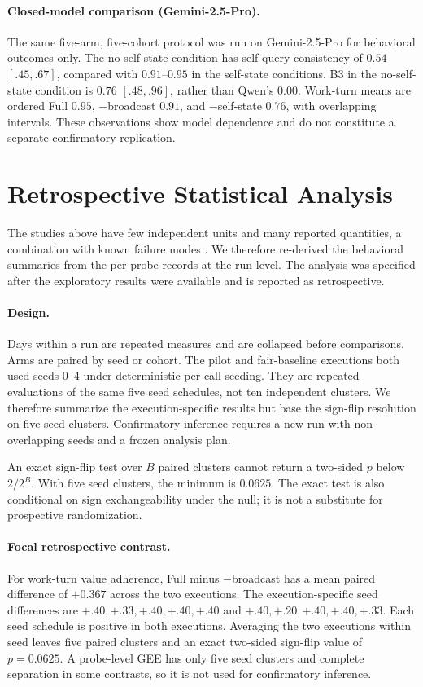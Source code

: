 \documentclass{article}
\begin{document}
\paragraph{Closed-model comparison (Gemini-2.5-Pro).} The same five-arm, five-cohort protocol was run on Gemini-2.5-Pro for behavioral outcomes only. The no-self-state condition has self-query consistency of $0.54$ $[.45,.67]$, compared with $0.91$--$0.95$ in the self-state conditions. B3 in the no-self-state condition is $0.76$ $[.48,.96]$, rather than Qwen's $0.00$. Work-turn means are ordered Full $0.95$, $-$broadcast $0.91$, and $-$self-state $0.76$, with overlapping intervals. These observations show model dependence and do not constitute a separate confirmatory replication.

\section{Retrospective Statistical Analysis}
\label{sec:stats}
The studies above have few independent units and many reported quantities, a combination with known failure modes \citep{card2020power,henderson2018deeprl}. We therefore re-derived the behavioral summaries from the per-probe records at the run level. The analysis was specified after the exploratory results were available and is reported as retrospective.

\paragraph{Design.} Days within a run are repeated measures and are collapsed before comparisons. Arms are paired by seed or cohort. The pilot and fair-baseline executions both used seeds 0--4 under deterministic per-call seeding. They are repeated evaluations of the same five seed schedules, not ten independent clusters. We therefore summarize the execution-specific results but base the sign-flip resolution on five seed clusters. Confirmatory inference requires a new run with non-overlapping seeds and a frozen analysis plan.

An exact sign-flip test over $B$ paired clusters cannot return a two-sided $p$ below $2/2^B$. With five seed clusters, the minimum is $0.0625$. The exact test is also conditional on sign exchangeability under the null; it is not a substitute for prospective randomization.

\paragraph{Focal retrospective contrast.} For work-turn value adherence, Full minus $-$broadcast has a mean paired difference of $+0.367$ across the two executions. The execution-specific seed differences are $+.40, +.33, +.40, +.40, +.40$ and $+.40, +.20, +.40, +.40, +.33$. Each seed schedule is positive in both executions. Averaging the two executions within seed leaves five paired clusters and an exact two-sided sign-flip value of $p=0.0625$. A probe-level GEE has only five seed clusters and complete separation in some contrasts, so it is not used for confirmatory inference.
\end{document}
